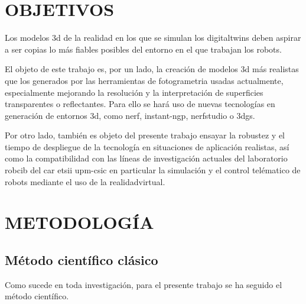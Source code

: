 \documentclass[a4paper, 12pt, spanish, twoside]{article}
\begin{document}




\newpage
\section{OBJETIVOS} \label{sec:objetivos}

Los modelos \acrshort{3d} de la realidad en los que se simulan los \glspl{digitaltwin} deben aspirar a ser copias lo más fiables posibles del entorno en el que trabajan los robots.  

El objeto de este trabajo es, por un lado, la creación de modelos \acrshort{3d} más realistas que los generados por las herramientas de \gls{fotogrametria} usadas actualmente, especialmente mejorando la resolución y la interpretación de superficies transparentes o reflectantes. Para ello se hará uso de nuevas tecnologías en generación de entornos \acrshort{3d}, como \acrfull{nerf}, \gls{instant-ngp}, \gls{nerfstudio} o \acrfull{3dgs}. 

Por otro lado, también es objeto del presente trabajo ensayar la robustez y el tiempo de despliegue de la tecnología en situaciones de aplicación realistas, así como la compatibilidad con las líneas de investigación actuales del laboratorio \acrfull{robcib} del \acrshort{car} \acrshort{etsii} \acrshort{upm}-\acrshort{csic} en particular la simulación y el control telématico de robots mediante el uso de la \gls{realidadvirtual}. 

\clearpage





\newpage
\section{METODOLOGÍA} \label{sec:metodologia}

\subsection{Método científico clásico} \label{sec:metodologia:clasico} 

Como sucede en toda investigación, para el presente trabajo se ha seguido el método científico. 
\end{document}
